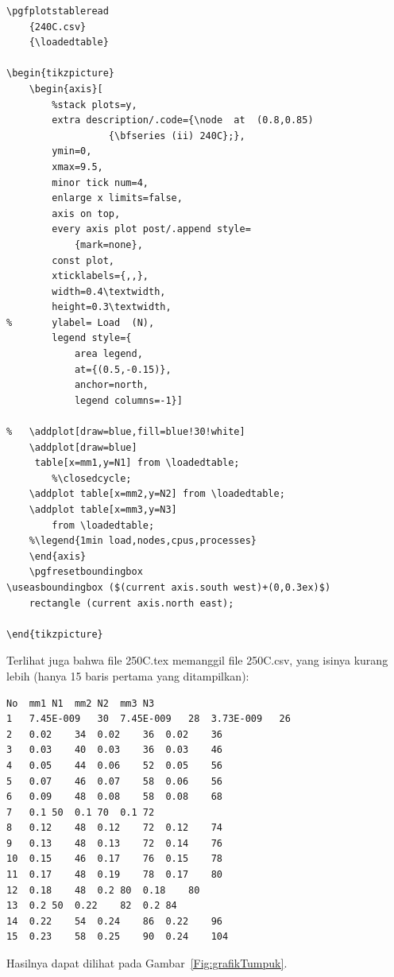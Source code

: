 \begin{verbatim}
\pgfplotstableread
	{240C.csv}
	{\loadedtable}

\begin{tikzpicture}
	\begin{axis}[
	    %stack plots=y,
	    extra description/.code={\node  at  (0.8,0.85) 
                  {\bfseries (ii) 240C};},
		ymin=0,
		xmax=9.5,
		minor tick num=4,
		enlarge x limits=false,
		axis on top,
		every axis plot post/.append style=
			{mark=none},
		const plot,
		xticklabels={,,},
		width=0.4\textwidth,
		height=0.3\textwidth,
%		ylabel= Load  (N),
		legend style={
			area legend,
			at={(0.5,-0.15)},
			anchor=north,
			legend columns=-1}]

%	\addplot[draw=blue,fill=blue!30!white]
	\addplot[draw=blue]
	 table[x=mm1,y=N1] from \loadedtable;
		%\closedcycle;
	\addplot table[x=mm2,y=N2] from \loadedtable;
	\addplot table[x=mm3,y=N3] 
		from \loadedtable;
	%\legend{1min load,nodes,cpus,processes}
	\end{axis}
	\pgfresetboundingbox
\useasboundingbox ($(current axis.south west)+(0,0.3ex)$)
    rectangle (current axis.north east);

\end{tikzpicture}
\end{verbatim}
Terlihat juga bahwa file 250C.tex memanggil
file 250C.csv, yang isinya kurang lebih (hanya 15 baris pertama
yang ditampilkan): 
\begin{verbatim}
No	mm1	N1	mm2	N2	mm3	N3
1	7.45E-009	30	7.45E-009	28	3.73E-009	26
2	0.02	34	0.02	36	0.02	36
3	0.03	40	0.03	36	0.03	46
4	0.05	44	0.06	52	0.05	56
5	0.07	46	0.07	58	0.06	56
6	0.09	48	0.08	58	0.08	68
7	0.1	50	0.1	70	0.1	72
8	0.12	48	0.12	72	0.12	74
9	0.13	48	0.13	72	0.14	76
10	0.15	46	0.17	76	0.15	78
11	0.17	48	0.19	78	0.17	80
12	0.18	48	0.2	80	0.18	80
13	0.2	50	0.22	82	0.2	84
14	0.22	54	0.24	86	0.22	96
15	0.23	58	0.25	90	0.24	104
\end{verbatim}
Hasilnya dapat dilihat pada Gambar~\ref{Fig:grafikTumpuk}.
